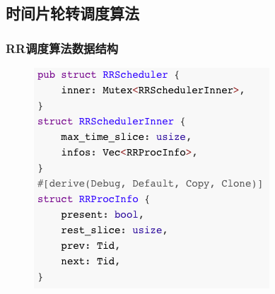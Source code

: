 % 
% 
% 
\subsection{时间片轮转调度算法} %
\begin{frame}[fragile]
    \frametitle{RR调度算法数据结构}
    \begin{figure}
    \includegraphics[width=0.5\linewidth]{figs/RRScheduler.png}
    \end{figure}
\end{frame}

